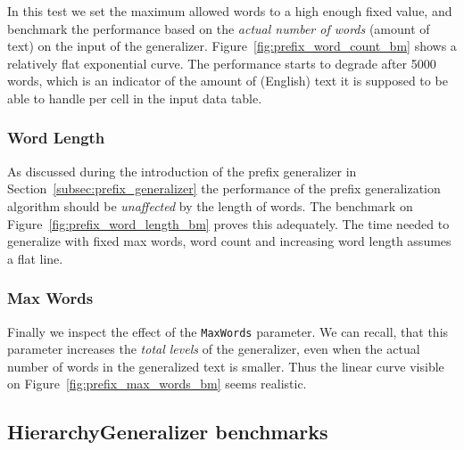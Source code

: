 In this test we set the maximum allowed words to a high enough fixed value, and benchmark the performance based on the \emph{actual number of words} (amount of text) on the input of the generalizer. Figure~\ref{fig:prefix_word_count_bm} shows a relatively flat exponential curve. The performance starts to degrade after 5000 words, which is an indicator of the amount of (English) text it is supposed to be able to handle per cell in the input data table.

\vspace{\baselineskip}


\subsubsection{Word Length}

As discussed during the introduction of the prefix generalizer in Section~\ref{subsec:prefix_generalizer} the performance of the prefix generalization algorithm should be \emph{unaffected} by the length of words. The benchmark on Figure~\ref{fig:prefix_word_length_bm} proves this adequately. The time needed to generalize with fixed max words, word count and increasing word length assumes a flat line.

\vspace{\baselineskip}


\subsubsection{Max Words}

Finally we inspect the effect of the \texttt{MaxWords} parameter. We can recall, that this parameter increases the \emph{total levels} of the generalizer, even when the actual number of words in the generalized text is smaller. Thus the linear curve visible on Figure~\ref{fig:prefix_max_words_bm} seems realistic.

\vspace{\baselineskip}


\subsection{HierarchyGeneralizer benchmarks}

